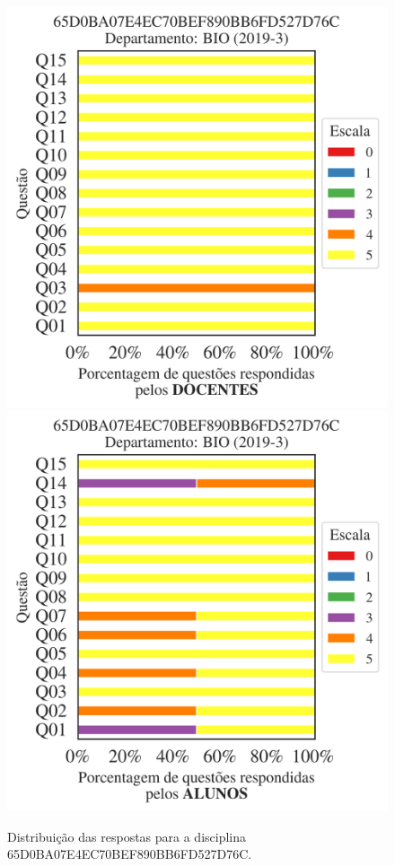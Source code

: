 \documentclass[a4paper,10pt]{article}
\begin{document}
\begin{figure}[h]
\centering
\includegraphics[width=0.485\linewidth]{analise_disciplina_departamento_BIO_65D0BA07E4EC70BEF890BB6FD527D76C_docentes.png}
\includegraphics[width=0.485\linewidth]{analise_disciplina_departamento_BIO_65D0BA07E4EC70BEF890BB6FD527D76C_alunos.png}
\caption{\label{fig:analise_geral_departamento}                Distribuição das respostas para a disciplina 65D0BA07E4EC70BEF890BB6FD527D76C. }
\end{figure}
\end{document}
